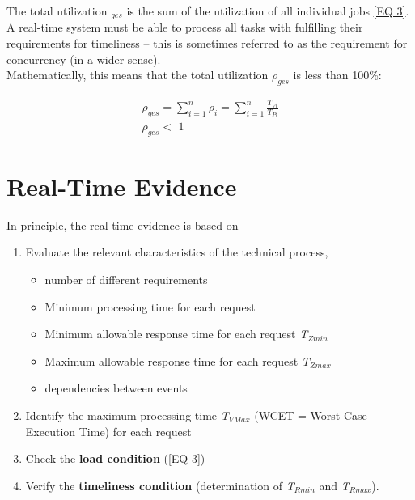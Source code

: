 The total utilization ${}_{ges}$ is the sum of the utilization of all individual jobs \ref{EQ 3}. A real-time system must be able to process all tasks with fulfilling their requirements for timeliness -- this is sometimes referred to as the requirement for concurrency (in a wider sense).\\

 Mathematically, this means that the total utilization \textit{${\rho}_{ges}$} is less than 100\%:

\begin{equation}
	\begin{array}{l} {\rho _{ges} =\sum _{i=1}^{n}\rho _{i} = \sum _{i=1}^{n}\frac{T_{Vi} }{T_{Pi} }  } \\ {\rho _{ges} <\, \, 1} \end{array}
\label{EQ 3}
\end{equation}
\newpage

\section{Real-Time Evidence}

In principle, the real-time evidence is based on

\begin{enumerate}
	\item  Evaluate the relevant characteristics of the technical process,
	\begin{itemize}
		\item  number of different requirements
		\item  Minimum processing time for each request
		\item  Minimum allowable response time for each request \textit{T${}_{Zmin}$}
		\item  Maximum allowable response time for each request \textit{T${}_{Zmax}$}
		\item  dependencies between events
	\end{itemize}
	\item  Identify the maximum processing time \textit{T${}_{VMax}$} (WCET = Worst Case Execution Time) for each request
	\item  Check the\textbf{ load condition} (\ref{EQ 3})
	\item  Verify the \textbf{timeliness condition} (determination of \textit{T${}_{Rmin}$} and \textit{T${}_{Rmax}$}).
\end{enumerate}

